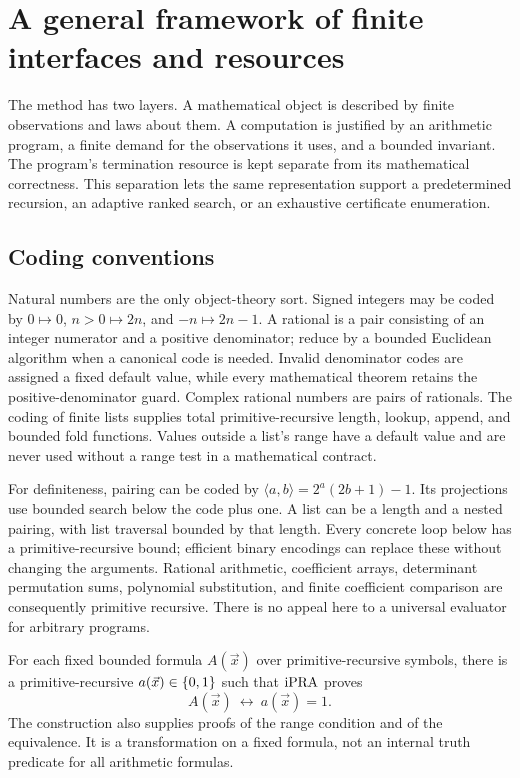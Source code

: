 \section{A general framework of finite interfaces and resources}
\label{sec:framework}

The method has two layers. A mathematical object is described by finite
observations and laws about them. A computation is justified by an
arithmetic program, a finite demand for the observations it uses, and a
bounded invariant. The program's termination resource is kept separate
from its mathematical correctness. This separation lets the same
representation support a predetermined recursion, an adaptive ranked
search, or an exhaustive certificate enumeration.

\subsection{Coding conventions}

Natural numbers are the only object-theory sort. Signed integers may be
coded by \(0\mapsto0\), \(n>0\mapsto2n\), and
\(-n\mapsto2n-1\). A rational is a pair consisting of an integer numerator
and a positive denominator; reduce by a bounded Euclidean algorithm when
a canonical code is needed. Invalid denominator codes are assigned a
fixed default value, while every mathematical theorem retains the
positive-denominator guard. Complex rational numbers are pairs of
rationals. The coding of finite lists supplies total primitive-recursive
length, lookup, append, and bounded fold functions. Values outside a
list's range have a default value and are never used without a range
test in a mathematical contract.

For definiteness, pairing can be coded by
\(\langle a,b\rangle=2^a(2b+1)-1\). Its projections use bounded search
below the code plus one. A list can be a length and a nested pairing,
with list traversal bounded by that length. Every concrete loop below
has a primitive-recursive bound; efficient binary encodings can replace
these without changing the arguments. Rational arithmetic, coefficient
arrays, determinant permutation sums, polynomial substitution, and
finite coefficient comparison are consequently primitive recursive.
There is no appeal here to a universal evaluator for arbitrary programs.

\begin{lemma}
\label{lem:boolean}
For each fixed bounded formula \(A(\vec x)\) over primitive-recursive
symbols, there is a primitive-recursive \(a(\vec x)\in\{0,1\}\) such that
\(\mathrm{iPRA}\) proves
\[
             A(\vec x)\ \longleftrightarrow\ a(\vec x)=1.
\]
The construction also supplies proofs of the range condition and of the
equivalence. It is a transformation on a fixed formula, not an internal
truth predicate for all arithmetic formulas.
\end{lemma}


